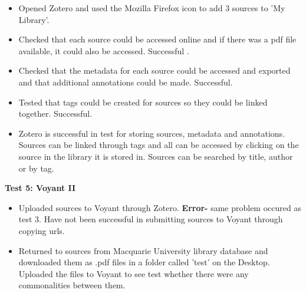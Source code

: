 \documentclass{article}
\begin{document}
\begin{itemize}
    \item Opened Zotero and used the Mozilla Firefox icon to add 3 sources to 'My Library'.
    \item Checked that each source could be accessed online and if there was a pdf file available, it could also be accessed. Successful .
    \item Checked that the metadata for each source could be accessed and exported and that additional annotations could be made. Successful.
    \item Tested that tags could be created for sources so they could be linked together. Successful.
    \item Zotero is successful in test for storing sources, metadata and annotations. Sources can be linked through tags and all can be accessed by clicking on the source in the library it is stored in. Sources can be searched by title, author or by tag.
    \end{itemize}
\textbf{Test 5: Voyant II}
\begin{itemize}
    \item Uploaded sources to Voyant through Zotero. \textbf{Error-} same problem occured as test 3. Have not been successful in submitting sources to Voyant through copying urls. 
    \item Returned to sources from Macquarie University library database and downloaded them as .pdf files in a folder called 'test' on the Desktop. Uploaded the files to Voyant to see test whether there were any commonalities between them.
    

\end{itemize}
\end{document}

